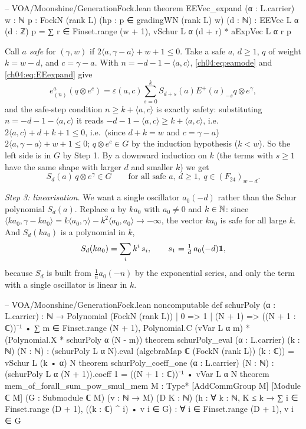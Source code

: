 \begin{leancode}
-- VOA/Moonshine/GenerationFock.lean
theorem EEVec_expand (α : L.carrier) {w : ℕ} {p : FockN (rank L)}
    (hp : p ∈ gradingWN (rank L) w) (d : ℕ) :
    EEVec L α (d : ℤ) p
      = ∑ r ∈ Finset.range (w + 1), vSchur L α (d + r) * aExpVec L α r p
\end{leancode}

Call $a$ \emph{safe} for $(\gamma,w)$ if $2\langle a,\gamma-a\rangle+w+1\le0$. Take a safe $a$, $d\ge1$, $q$
of weight $k=w-d$, and $c=\gamma-a$. With $n=-d-1-\langle a,c\rangle$, \eqref{ch04:eq:eamode} and
\eqref{ch04:eq:EEexpand} give
\begin{equation*}
  e^a_{(n)}(q\otimes e^c)=\varepsilon(a,c)\sum_{s=0}^kS_{d+s}(a)E^+(a)_{-s}q\otimes e^\gamma,
\end{equation*}
and the safe-step condition $n\ge k+\langle a,c\rangle$ is exactly safety: substituting
$n=-d-1-\langle a,c\rangle$ it reads $-d-1-\langle a,c\rangle\ge k+\langle a,c\rangle$, i.e.\
$2\langle a,c\rangle+d+k+1\le0$, i.e.\ (since $d+k=w$ and $c=\gamma-a$) $2\langle a,\gamma-a\rangle+w+1\le0$; $q\otimes e^c\in G$ by the induction hypothesis
($k<w$). So the left side is in $G$ by Step 1. By a downward induction on $k$ (the terms with $s\ge1$
have the same shape with larger $d$ and smaller $k$) we get
\begin{equation*}
  S_d(a)\,q\otimes e^\gamma\in G\qquad\text{for all safe }a,\ d\ge1,\ q\in(F_{24})_{w-d}.
\end{equation*}

\emph{Step 3: linearisation.} We want a single oscillator $a_0(-d)$ rather than the Schur
polynomial $S_d(a)$. Replace $a$ by $ka_0$ with $a_0\neq0$ and $k\in{\mathbb{N}}$: since
$\langle ka_0,\gamma-ka_0\rangle=k\langle a_0,\gamma\rangle-k^2\langle a_0,a_0\rangle\to-\infty$, the vector
$ka_0$ is safe for all large $k$. And $S_d(ka_0)$ is a polynomial in $k$,
\begin{equation*}
  S_d(ka_0)=\sum_{i}k^i\,s_i,\qquad s_1=\tfrac1d\,a_0(-d)\mathbf{1},
\end{equation*}
because $S_d$ is built from $\tfrac1n a_0(-n)$ by the exponential series, and only the term with a
single oscillator is linear in $k$.

\begin{leancode}
-- VOA/Moonshine/GenerationFock.lean
noncomputable def schurPoly (α : L.carrier) : ℕ → Polynomial (FockN (rank L))
  | 0 => 1
  | (N + 1) => ((N + 1 : ℂ))⁻¹ • ∑ m ∈ Finset.range (N + 1),
      Polynomial.C (vVar L α m) * (Polynomial.X * schurPoly α (N - m))
theorem schurPoly_eval (α : L.carrier) (k : ℕ) (N : ℕ) :
    (schurPoly L α N).eval (algebraMap ℂ (FockN (rank L)) (k : ℂ)) = vSchur L (k • α) N
theorem schurPoly_coeff_one (α : L.carrier) (N : ℕ) :
    (schurPoly L α (N + 1)).coeff 1 = ((N + 1 : ℂ))⁻¹ • vVar L α N
theorem mem_of_forall_sum_pow_smul_mem {M : Type*} [AddCommGroup M] [Module ℂ M]
    (G : Submodule ℂ M) (v : ℕ → M) (D K : ℕ)
    (h : ∀ k : ℕ, K ≤ k → ∑ i ∈ Finset.range (D + 1), ((k : ℂ) ^ i) • v i ∈ G) :
    ∀ i ∈ Finset.range (D + 1), v i ∈ G
\end{leancode}

